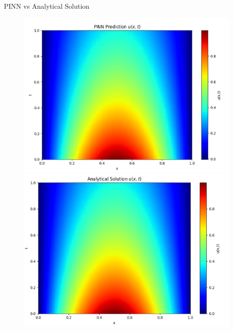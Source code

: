 \documentclass{beamer}
\begin{document}
\begin{frame}{PINN vs Analytical Solution}
    \begin{figure}[H]
        \centering
        \begin{minipage}{0.48\textwidth}
            \centering
            \includegraphics[width=\linewidth]{pres_PINN.png}
        \end{minipage}
        \hfill
        \begin{minipage}{0.48\textwidth}
            \centering
            \includegraphics[width=\linewidth]{pres_analytical.png}
        \end{minipage}
    \end{figure}
\end{frame}
\end{document}
